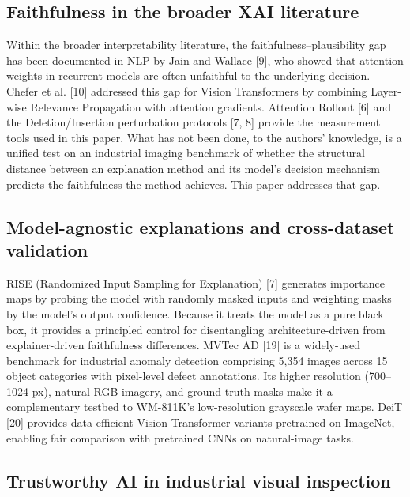 \documentclass[11pt,a4paper]{article}
\begin{document}
\subsection{Faithfulness in the broader XAI literature}

Within the broader interpretability literature, the faithfulness--plausibility gap has been documented in NLP by Jain and Wallace [9], who showed that attention weights in recurrent models are often unfaithful to the underlying decision. Chefer et al. [10] addressed this gap for Vision Transformers by combining Layer-wise Relevance Propagation with attention gradients. Attention Rollout [6] and the Deletion/Insertion perturbation protocols [7, 8] provide the measurement tools used in this paper. What has not been done, to the authors' knowledge, is a unified test on an industrial imaging benchmark of whether the structural distance between an explanation method and its model's decision mechanism predicts the faithfulness the method achieves. This paper addresses that gap.

\subsection{Model-agnostic explanations and cross-dataset validation}

RISE (Randomized Input Sampling for Explanation) [7] generates importance maps by probing the model with randomly masked inputs and weighting masks by the model's output confidence. Because it treats the model as a pure black box, it provides a principled control for disentangling architecture-driven from explainer-driven faithfulness differences. MVTec AD [19] is a widely-used benchmark for industrial anomaly detection comprising 5,354 images across 15 object categories with pixel-level defect annotations. Its higher resolution (700--1024 px), natural RGB imagery, and ground-truth masks make it a complementary testbed to WM-811K's low-resolution grayscale wafer maps. DeiT [20] provides data-efficient Vision Transformer variants pretrained on ImageNet, enabling fair comparison with pretrained CNNs on natural-image tasks.

\subsection{Trustworthy AI in industrial visual inspection}
\end{document}
